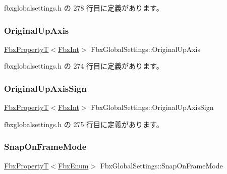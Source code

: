  fbxglobalsettings.\+h の 278 行目に定義があります。

\mbox{\label{class_fbx_global_settings_a10e95e9c826439215508c788cfdad514}} 
\subsubsection{\texorpdfstring{Original\+Up\+Axis}{OriginalUpAxis}}
{\footnotesize\ttfamily \hyperlink{class_fbx_property_t}{Fbx\+PropertyT}$<$\hyperlink{fbxtypes_8h_a088fa96de3b0b3ea69f0f6afef525dfb}{Fbx\+Int}$>$ Fbx\+Global\+Settings\+::\+Original\+Up\+Axis\hspace{0.3cm}{\ttfamily [protected]}}



 fbxglobalsettings.\+h の 274 行目に定義があります。

\mbox{\label{class_fbx_global_settings_a22385a53e9b333a7d3708a787724ade4}} 
\subsubsection{\texorpdfstring{Original\+Up\+Axis\+Sign}{OriginalUpAxisSign}}
{\footnotesize\ttfamily \hyperlink{class_fbx_property_t}{Fbx\+PropertyT}$<$\hyperlink{fbxtypes_8h_a088fa96de3b0b3ea69f0f6afef525dfb}{Fbx\+Int}$>$ Fbx\+Global\+Settings\+::\+Original\+Up\+Axis\+Sign\hspace{0.3cm}{\ttfamily [protected]}}



 fbxglobalsettings.\+h の 275 行目に定義があります。

\mbox{\label{class_fbx_global_settings_aa698429b48e7e2c404a7a0ca8bdee18e}} 
\subsubsection{\texorpdfstring{Snap\+On\+Frame\+Mode}{SnapOnFrameMode}}
{\footnotesize\ttfamily \hyperlink{class_fbx_property_t}{Fbx\+PropertyT}$<$\hyperlink{fbxtypes_8h_a9a28614cb4272a0ad7d748eda7f3d3e5}{Fbx\+Enum}$>$ Fbx\+Global\+Settings\+::\+Snap\+On\+Frame\+Mode\hspace{0.3cm}{\ttfamily [protected]}}



